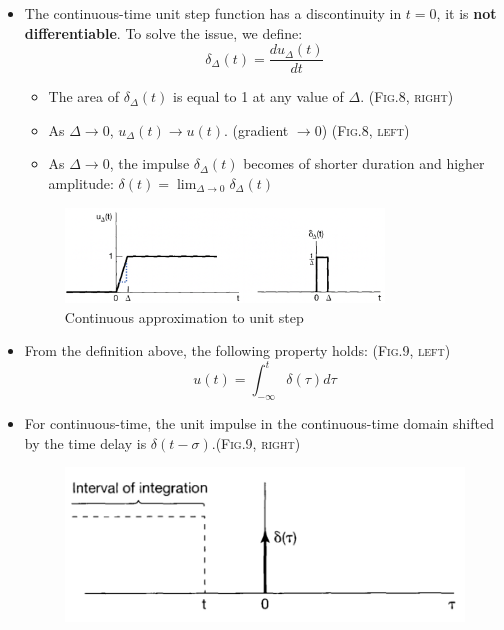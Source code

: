 \begin{itemize}
\item The continuous-time unit step function has a discontinuity in $t=0$, it is \textbf{not differentiable}. To solve the issue, we define:\[ \delta_{\Delta}(t) = \frac{du_{\Delta}(t)}{dt} \]
 \begin{itemize}
 \item The area of $\delta_{\Delta}(t)$ is equal to 1 at any value of $\Delta$. (\textsc{Fig.8, right})
 \item As $\Delta \rightarrow 0$, $u_{\Delta}(t) \rightarrow u(t)$. (gradient $\to 0$) (\textsc{Fig.8, left})

 \item As $\Delta \rightarrow 0$, the impulse $\delta_{\Delta}(t)$ becomes of shorter duration and higher amplitude:
 $ \delta(t) = \lim_{\Delta \to 0} \delta_{\Delta}(t) $
 \end{itemize}
\begin{figure}[h] \centering \includegraphics[width=0.8\textwidth]{images/6.5}
\caption{Continuous approximation to unit step} \end{figure}
\item From the definition above, the following property holds: (\textsc{Fig.9, left})
\[ u(t) = \int_{-\infty}^{t} \delta(\tau) d\tau \]
\item For continuous-time, the unit impulse in the continuous-time domain shifted by the time delay is $\delta (t-\sigma)$.(\textsc{Fig.9, right})
 \begin{figure}[H] \centering
 \begin{minipage}[b]{0.45\linewidth} \centering \includegraphics[width=\linewidth]{images/6.6} \end{minipage}

\end{figure}
\end{itemize}

